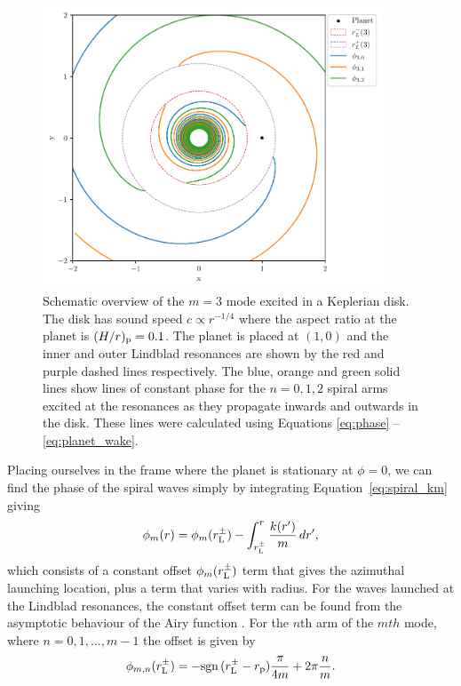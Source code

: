\begin{figure}
    \centering
    \includegraphics[width = 0.9\textwidth]{figures/wakes_m3.pdf}
    \caption{Schematic overview of the $m=3$ mode excited in a Keplerian disk. The disk has sound speed $c \propto r^{-1/4}$ where the aspect ratio at the planet is $(H/r)_{\rm p} = 0.1$.
    The planet is placed at $(1,0)$ and the inner and outer Lindblad resonances are shown by the red and purple dashed lines respectively.
    The blue, orange and green solid lines show lines of constant phase for the $n=0,1,2$ spiral arms excited at the resonances as they propagate inwards and outwards in the disk.
    These lines were calculated using Equations \eqref{eq:phase} -- \eqref{eq:planet_wake}.}
    \label{fig:wakes_m3}
\end{figure}
Placing ourselves in the frame where the planet is stationary at $\phi = 0$, we can find the phase of the spiral waves simply by integrating Equation~\eqref{eq:spiral_km} giving \citep{bae2018a}
\begin{align}
    \phi_m (r) = \phi_m(r_{\rm L}^\pm) - \int_{r_{\rm L}^\pm}^r \frac{k(r')}{m} \, dr', \label{eq:phase}
\end{align}
which consists of a constant offset $\phi_m(r_{\rm L}^\pm)$ term that gives the azimuthal launching location, plus a term that varies with radius.
For the waves launched at the Lindblad resonances, the constant offset term can be found from the asymptotic behaviour of the Airy function \citep{ward1986}. 
For the $n$th arm of the $mth$ mode, where $n = 0, 1, ..., m-1$ the offset is given by 
\begin{align}
    \phi_{m,n}(r_{\rm L}^\pm) = - \mathrm{sgn}\, (r_{\rm L}^\pm - r_{\rm p}) \frac{\pi}{4m} + 2 \pi\frac{n}{m}. \label{eq:spiral_offset}
\end{align}
